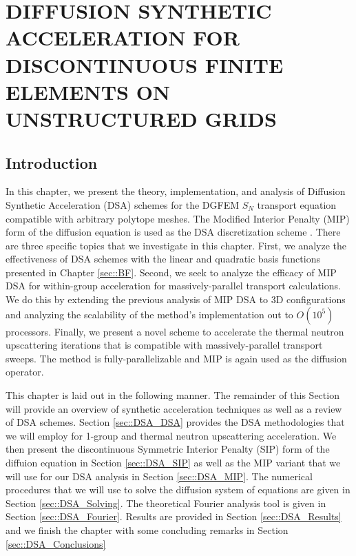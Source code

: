 %
%
%
\chapter{\uppercase {Diffusion Synthetic Acceleration for Discontinuous Finite Elements on Unstructured Grids}}
\label{sec::DSA}

\section{Introduction}
\label{sec::DSA_Introduction}

In this chapter, we present the theory, implementation, and analysis of Diffusion Synthetic Acceleration (DSA) schemes for the DGFEM $S_N$ transport equation compatible with arbitrary polytope meshes. The Modified Interior Penalty (MIP) form of the diffusion equation is used as the DSA discretization scheme \cite{ref::DSA_wang_ragusa,turcksin2014discontinuous}. There are three specific topics that we investigate in this chapter. First, we analyze the effectiveness of DSA schemes with the linear and quadratic basis functions presented in Chapter \ref{sec::BF}. Second, we seek to analyze the efficacy of MIP DSA for within-group acceleration for massively-parallel transport calculations. We do this by extending the previous analysis of MIP DSA to 3D configurations and analyzing the scalability of the method's implementation out to $O(10^5)$ processors. Finally, we present a novel scheme to accelerate the thermal neutron upscattering iterations that is compatible with massively-parallel transport sweeps. The method is fully-parallelizable and MIP is again used as the diffusion operator.

This chapter is laid out in the following manner. The remainder of this Section will provide an overview of synthetic acceleration techniques as well as a review of DSA schemes. Section \ref{sec::DSA_DSA} provides the DSA methodologies that we will employ for 1-group and thermal neutron upscattering acceleration. We then present the discontinuous Symmetric Interior Penalty (SIP) form of the diffuion equation in Section \ref{sec::DSA_SIP} as well as the MIP variant that we will use for our DSA analysis in Section \ref{sec::DSA_MIP}. The numerical procedures that we will use to solve the diffusion system of equations are given in Section \ref{sec::DSA_Solving}. The theoretical Fourier analysis tool is given in Section \ref{sec::DSA_Fourier}. Results are provided in Section \ref{sec::DSA_Results} and we finish the chapter with some concluding remarks in Section \ref{sec::DSA_Conclusions}

